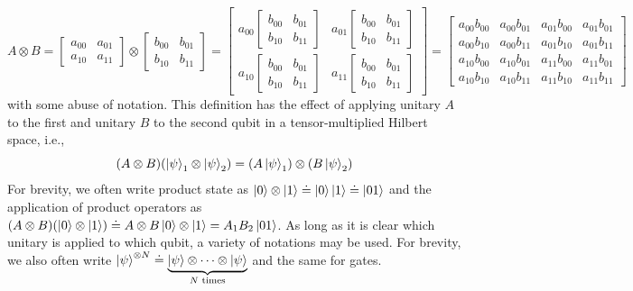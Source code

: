		\begin{equation}
			A \otimes B
				= \begin{bmatrix} a_{00} & a_{01} \\ a_{10} & a_{11} \end{bmatrix} \otimes \begin{bmatrix} b_{00} & b_{01} \\ b_{10} & b_{11} \end{bmatrix}
				= \begin{bmatrix} a_{00} \begin{bmatrix} b_{00} & b_{01} \\ b_{10} & b_{11} \end{bmatrix} & a_{01} \begin{bmatrix} b_{00} & b_{01} \\ b_{10} & b_{11} \end{bmatrix} \\ a_{10} \begin{bmatrix} b_{00} & b_{01} \\ b_{10} & b_{11} \end{bmatrix} & a_{11} \begin{bmatrix} b_{00} & b_{01} \\ b_{10} & b_{11} \end{bmatrix} \end{bmatrix}
				=
					\begin{bmatrix}
						a_{00} b_{00} & a_{00} b_{01} & a_{01} b_{00} & a_{01} b_{01} \\
						a_{00} b_{10} & a_{00} b_{11} & a_{01} b_{10} & a_{01} b_{11} \\
						a_{10} b_{00} & a_{10} b_{01} & a_{11} b_{00} & a_{11} b_{01} \\
						a_{10} b_{10} & a_{10} b_{11} & a_{11} b_{10} & a_{11} b_{11}
					\end{bmatrix}
		\end{equation}
		with some abuse of notation. This definition has the effect of applying unitary \(A\) to the first and unitary \(B\) to the second qubit in a tensor-multiplied Hilbert space, i.e.,
		\begin{equation}
			(A \otimes B) (\ket{\psi}_1 \otimes \ket{\psi}_2) = (A \ket{\psi}_1) \otimes (B \ket{\psi}_2)
		\end{equation}
		For brevity, we often write product state as \( \ket{0} \otimes \ket{1} \doteq \ket{0} \ket{1} \doteq \ket{01} \) and the application of product operators as \( (A \otimes B) (\ket{0} \otimes \ket{1}) \doteq A \otimes B \ket{0} \otimes \ket{1} = A_1 B_2 \ket{01} \). As long as it is clear which unitary is applied to which qubit, a variety of notations may be used. For brevity, we also often write \( \ket{\psi}^{\otimes N} \doteq \underbrace{\ket{\psi} \otimes \dots \otimes \ket{\psi}}_{N\text{ times}} \) and the same for gates.

